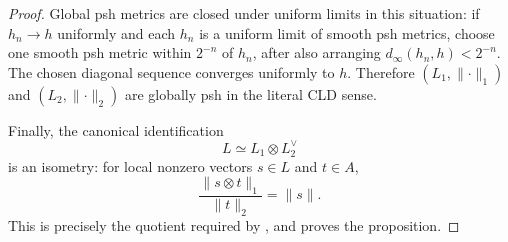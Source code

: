 \begin{proof}
Global psh metrics are closed under uniform limits in this situation:
if \(h_n\to h\) uniformly and each \(h_n\) is a uniform limit of smooth psh
metrics, choose one smooth psh metric within \(2^{-n}\) of \(h_n\), after
also arranging \(d_\infty(h_n,h)<2^{-n}\).  The chosen diagonal sequence
converges uniformly to \(h\).  Therefore
\((L_1,\lVert\cdot\rVert_1)\) and
\((L_2,\lVert\cdot\rVert_2)\) are globally psh in the literal CLD sense.

Finally, the canonical identification
\[
                         L\simeq L_1\otimes L_2^\vee
\]
is an isometry: for local nonzero vectors \(s\in L\) and \(t\in A\),
\[
             \frac{\lVert s\otimes t\rVert_1}
                  {\lVert t\rVert_2}=\lVert s\rVert.
\]
This is precisely the quotient required by
\cite[17.8.5]{CLD25}, and proves the proposition.
\end{proof}
